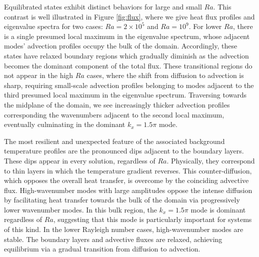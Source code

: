 \documentclass[twocolumn,showpacs,amsmath,amssymb]{revtex4}
\begin{document}
Equilibrated states exhibit distinct behaviors for large and small $Ra$. This contrast is well illustrated in Figure \ref{fig:flux}, where we give heat flux profiles and eigenvalue spectra for two cases: $Ra = 2 \times 10^5$ and $Ra = 10^9$. For lower $Ra$, there is a single presumed local maximum in the eigenvalue spectrum, whose adjacent modes' advection profiles occupy the bulk of the domain. Accordingly, these states have relaxed boundary regions which gradually diminish as the advection becomes the dominant component of the total flux. These transitional regions do not appear in the high $Ra$ cases, where the shift from diffusion to advection is sharp, requiring small-scale advection profiles belonging to modes adjacent to the third presumed local maximum in the eigenvalue spectrum. Traversing towards the midplane of the domain, we see increasingly thicker advection profiles corresponding the wavenumbers adjacent to the second local maximum, eventually culminating in the dominant $k_x = 1.5\pi$ mode.

\par The most resilient and unexpected feature of the associated background temperature profiles are the pronounced dips adjacent to the boundary layers. These dips appear in every solution, regardless of $Ra$. Physically, they correspond to thin layers in which the temperature gradient reverses. This counter-diffusion, which opposes the overall heat transfer, is overcome by the coinciding advective flux. High-wavenumber modes with large amplitudes oppose the intense diffusion by facilitating heat transfer towards the bulk of the domain via progressively lower wavenumber modes. In this bulk region, the $k_x = 1.5\pi$ mode is dominant regardless of $Ra$, suggesting that this mode is particularly important for systems of this kind. In the lower Rayleigh number cases, high-wavenumber modes are stable. The boundary layers and advective fluxes are relaxed, achieving equilibrium via a gradual transition from diffusion to advection.
\end{document}
